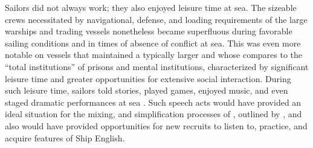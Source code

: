Sailors did not always work; they also enjoyed leisure time at sea. The sizeable crews necessitated by navigational, defense, and loading requirements of the large warships and  trading vessels nonetheless became superfluous during favorable sailing conditions and in times of absence of conflict at sea. This was even more notable on  vessels that maintained a typically larger  and whose  \citet{Burg2001} compares to the “total institutions” of prisons and mental institutions, characterized by significant leisure time and greater opportunities for extensive social interaction. During such leisure time, sailors told stories, played games, enjoyed music, and even staged dramatic performances at sea \citep[155]{Rediker2004}. Such speech acts would have provided an ideal situation for the mixing,  and simplification processes of , outlined by \citet{Trudgill1986}, and also would have provided opportunities for new recruits to listen to, practice, and acquire features of Ship English.

\begin{figure}
\hfill
{}

\end{figure}


